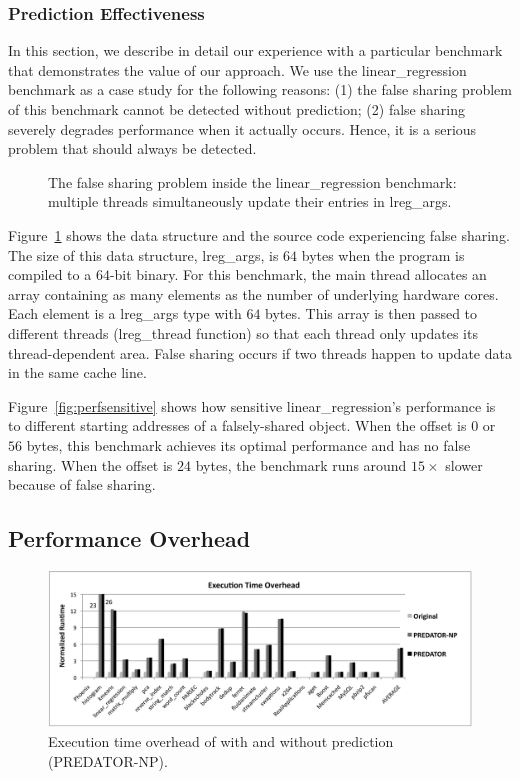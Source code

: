 \subsubsection{Prediction Effectiveness}
\label{sec:predicteval}
In this section, we describe in detail our experience with a particular benchmark that demonstrates the value of our approach. We use the linear\_regression benchmark as a case study for the following reasons: (1) the false sharing problem of this benchmark cannot be detected without prediction; (2) false sharing severely degrades performance when it actually occurs. Hence, it is a serious problem that should always be detected. 

\begin{figure}[!t]
{\centering
\subfigure{}
\caption{The false sharing problem inside the linear\_regression benchmark: multiple threads simultaneously update their entries in lreg\_args.
\label{fig:linearregression}}
}
\end{figure}

Figure~\ref{fig:linearregression} shows the data structure and the source code experiencing false sharing. The size of this data structure, lreg\_args, is $64$ bytes 
when the program is compiled to a $64$-bit binary. For this benchmark, the main thread allocates an array containing as many elements as the number of underlying hardware cores. Each element is a lreg\_args type with $64$ bytes. This array is then passed to different threads (lreg\_thread function) so that each thread only updates its thread-dependent area. False sharing occurs if two threads happen to update data in the same cache line. 

Figure~\ref{fig:perfsensitive} shows how sensitive linear\_regression's performance is to different starting addresses of a falsely-shared object. When the offset is $0$ or $56$ bytes, this benchmark achieves its optimal performance and has no false sharing. When the offset is $24$ bytes, the benchmark runs around $15\times$ slower because of false sharing.

\subsection{Performance Overhead}
\label{sec:perfoverhead}

\begin{figure}[!t]
\centering
\includegraphics[width=6in]{fig/perf}
\caption{
Execution time overhead of \Predator{} with and without prediction (PREDATOR-NP).
\label{fig:perf}}
\end{figure}


